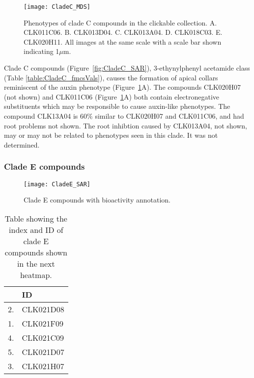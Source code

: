 \begin{figure}
\centering
\texttt{[image: CladeC\_MDS]}
\caption{Phenotypes of clade C compounds in the clickable collection. A. CLK011C06. B. CLK013D04. C. CLK013A04. D. CLK018C03. E. CLK020H11. All images at the same scale with a scale bar shown indicating 1$\mu$m.}
\label{fig:CladeC_MDS}
\end{figure}


Clade C compounds (Figure~\ref{fig:CladeC_SAR}), 3-ethynylphenyl acetamide class (Table \ref{table:CladeC_fmcsVals}), causes the formation of apical collars reminiscent of the auxin phenotype (Figure~\ref{fig:CladeC_MDS}A). The compounds CLK020H07 (not shown) and CLK011C06 (Figure~\ref{fig:CladeC_MDS}A) both contain electronegative substituents which may be responsible to cause auxin-like phenotypes. The compound CLK13A04 is 60{\%} similar to CLK020H07 and CLK011C06, and had root problems not shown. The root inhibtion caused by CLK013A04, not shown, may or may not be related to phenotypes seen in this clade. It was not determined.

\clearpage


\subsubsection{Clade E compounds}

\begin{figure}
\texttt{[image: CladeE\_SAR]}
\caption{Clade E compounds with bioactivity annotation.}
\label{fig:CladeE_SAR}
\end{figure}

\begin{table}\centering
    \begin{tabular}{|l|l|}
    \hline
  & ID \\ \hline 
2. & CLK021D08  \\ \hline
1. & CLK021F09  \\ \hline
4. & CLK021C09  \\ \hline
5. & CLK021D07  \\ \hline
3. & CLK021H07  \\ \hline
    \end{tabular}
    \caption {Table showing the  index and ID of clade E compounds shown in the next heatmap.}   
      \label{table:CladeE_fmcsVals}
\end{table}

